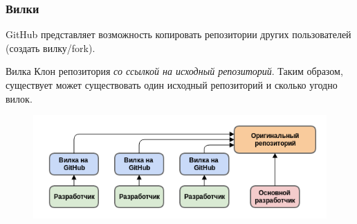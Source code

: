 \documentclass{beamer}
\begin{document}
\begin{frame}
  \frametitle{Вилки}
  GitHub представляет возможность копировать репозитории других пользователей (создать вилку/fork).

  \begin{block}{Вилка}
    Клон репозитория {\it со ссылкой на исходный репозиторий}. Таким образом,
    существует может существовать один исходный репозиторий и сколько угодно вилок.
  \end{block}

  \begin{figure}
    \includegraphics[width=12cm]{images/github-workflow.png}
  \end{figure}
\end{frame}
\end{document}
